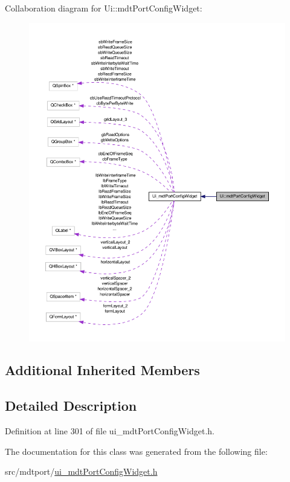 Collaboration diagram for Ui\-:\-:mdt\-Port\-Config\-Widget\-:\nopagebreak
\begin{figure}[H]
\begin{center}
\leavevmode
\includegraphics[width=350pt]{class_ui_1_1mdt_port_config_widget__coll__graph}
\end{center}
\end{figure}
\subsection*{Additional Inherited Members}


\subsection{Detailed Description}


Definition at line 301 of file ui\-\_\-mdt\-Port\-Config\-Widget.\-h.



The documentation for this class was generated from the following file\-:\begin{DoxyCompactItemize}
\item 
src/mdtport/\hyperlink{ui__mdt_port_config_widget_8h}{ui\-\_\-mdt\-Port\-Config\-Widget.\-h}\end{DoxyCompactItemize}
